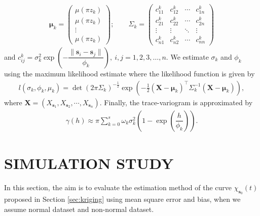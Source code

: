 \documentclass[
  12pt,
]{article}
\theoremstyle{definition}
\theoremstyle{definition}
\theoremstyle{definition}
\theoremstyle{remark}
\begin{document}
\begin{align*}
 \bm{\mu}_k = \begin{pmatrix}
             \mu(\pi z_k)\\
             \mu(\pi z_k)\\
             \vdots\\
             \mu(\pi z_k)
            \end{pmatrix};
            \qquad
    \Sigma_k = \begin{pmatrix}
              c_{11}^k & c_{12}^k & \cdots & c_{1n}^k\\
              c_{21}^k & c_{22}^k & \cdots & c_{2n}^k\\
              \vdots & \vdots & \ddots & \vdots \\
              c_{n1}^k & c_{n2}^k & \cdots & c_{nn}^k
             \end{pmatrix}
\end{align*}
and \(c_{ij}^k = \sigma_k^2 \exp \left( -\dfrac{\lVert \bm{s}_i -\bm{s}_j\rVert}{\phi_k} \right),\ i,j=1,2,3,\dots, n\).
We estimate \(\sigma_k\) and \(\phi_k\) using the maximum likelihood estimate where the likelihood function is given by
\begin{align*}
 l(\sigma_k, \phi_k, \mu_k) = \det (2 \pi \Sigma_k)^{-\frac{1}{2}} \exp \left(  -\frac{1}{2} (\bm{X}-\bm{\mu}_k)^\top \Sigma_k^{-1} (\bm{X}-\bm{\mu}_k) \right),
\end{align*}
where \(\bm{X} = \left( X_{\bm{s}_1}, X_{\bm{s}_2}, \cdots, X_{\bm{s}_n} \right)\). Finally, the trace-variogram is approximated by
\begin{align*}
 \gamma(h) \approx \pi \sum_{k=0}^{s} \omega_k \sigma_k^2\left(1- \exp \left( \dfrac{h}{\phi_k} \right) \right).
\end{align*}

\hypertarget{sec:simulation}{%
\section{SIMULATION STUDY}\label{sec:simulation}}

In this section, the aim is to evaluate the estimation method of the curve \(\chi_{\bm{s}_0}(t)\) proposed in Section \ref{sec:kriging} using mean square error and bias, when we assume normal dataset and non-normal dataset.
\end{document}
